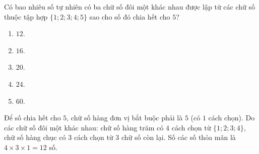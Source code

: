 \begin{baitap}
Có bao nhiêu số tự nhiên có ba chữ số đôi một khác nhau được lập từ các chữ số thuộc tập hợp $\{1; 2; 3; 4; 5\}$ sao cho số đó chia hết cho $5$?
\begin{enumerate}
	\item $12$.
	\item $16$.
	\item $20$.
	\item $24$.
	\item $60$.
\end{enumerate}
\begin{traloi}
	Để số chia hết cho $5$, chữ số hàng đơn vị bắt buộc phải là $5$ (có $1$ cách chọn). Do các chữ số đôi một khác nhau: chữ số hàng trăm có $4$ cách chọn từ $\{1; 2; 3; 4\}$, chữ số hàng chục có $3$ cách chọn từ $3$ chữ số còn lại. Số các số thỏa mãn là $4 \times 3 \times 1 = 12$ số.
\end{traloi}
\end{baitap}
